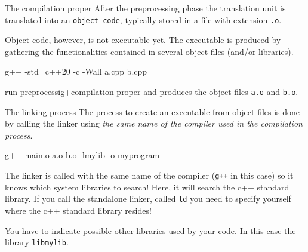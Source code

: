 \documentclass[12pt,aspectratio=169]{beamer}
\begin{document}


\begin{frame}{The compilation proper}
After the preprocessing phase the translation unit is translated into an \texttt{object code}, typically stored in a file
with extension \texttt{.o}.
\medskip

{\color{blue} Object code, however, is not executable yet}. The executable is produced by gathering the functionalities contained in several object files (and/or libraries). 
\medskip

\begin{semiverbatim}
g++ -std=c++20 -c -Wall a.cpp b.cpp
\end{semiverbatim}
run preprocessig+compilation proper and produces the object files \texttt{a.o} and \texttt{b.o}.

\end{frame}

\begin{frame}{The linking process}
The process to create an executable from object files is done by calling the linker using \emph{the same name of the compiler used in the compilation process}.
\begin{semiverbatim}
g++ main.o a.o b.o -lmylib -o myprogram
\end{semiverbatim}
The linker is called with the same name of the compiler (\texttt{g++} in this case) so it knows which system libraries to search! Here, it will search the c++ standard library. If you call the standalone linker, called \texttt{ld} you need to specify yourself where the c++ standard library resides!
\smallskip

You have to indicate possible other libraries used by your code. In this case the library \texttt{libmylib}.
\end{frame}
\end{document}
